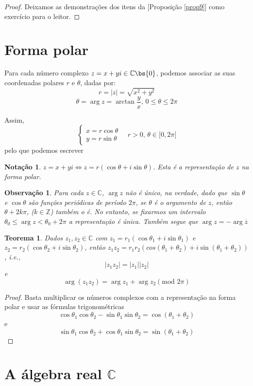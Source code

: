 \documentclass[12pt, oneside, a4paper, english, brazil]{abntex2}
\providecommand{\abs}[1]{\left\vert #1 \right\vert}
\newcommand{\C}{\mathbb{C}}
\providecommand{\propositionref}[1]{[Proposição \ref{#1}]}
\newcounter{geral}
\theoremstyle{normal}
\newtheorem{theorem}[geral]{Teorema}
\newtheorem{notation}[geral]{Notação}
\theoremstyle{observacao}
\newtheorem*{obs}{Observação}
\begin{document}
\begin{proof}
Deixamos as demonstrações dos itens da \propositionref{prop9} como exercício para o leitor.
\end{proof}

\section{Forma polar}
Para cada número complexo $z=x+yi \in \C \bs \{0\}$, podemos associar as suas coordenadas polares $r$ e $\theta$, dadas por:
\[
r = \abs{z} = \sqrt{x^2+y^2}
\]
\[
\theta = \arg z = \arctan \frac{y}{x} \text{, } 0 \leq \theta \leq 2\pi
\]

Assim, 
\[
\left\{\begin{array}{ll}
x= r \cos \theta\\
y= r \sin \theta
\end{array}
\right.
\quad r>0 \text{, } \theta \in [0, 2\pi[
\]
pelo que podemos escrever
\begin{notation}
$z=x+yi \Leftrightarrow z=r(\cos \theta + i \sin \theta)$. Esta é a representação de $z$ na forma polar.
\end{notation}

\begin{obs}
Para cada $z \in \C$, $\arg z$ não é único, na verdade, dado que $\sin \theta$ e $\cos \theta$ são funções periódicas de período $2\pi$, se $\theta$ é o argumento de $z$, então $\theta +2k\pi$, ($k \in \mathbb{Z}$) também o é. No entanto, se fixarmos um intervalo $\theta_0 \leq \arg z < \theta_0+2\pi$ a representação é única. Também segue que $\arg z = -\arg\overline{z}$
\end{obs}

\begin{theorem}
Dados $z_1,z_2 \in \C$ com $z_1 = r_1(\cos\theta_1+i\sin\theta_1)$ e $z_2 = r_2(\cos\theta_2+i\sin\theta_2)$, então $z_1z_2=r_1r_2(cos(\theta_1+\theta_2)+i\sin(\theta_1+\theta_2))$, i.e., 
\[
\abs{z_1z_2}=\abs{z_1}\abs{z_2}
\]
e
\[
\arg(z_1z_2) = \arg z_1 + \arg z_2 (\text{mod } 2\pi)
\] \label{teo12}
\end{theorem}
\begin{proof}
Basta multiplicar os números complexos com a representação na forma polar e usar as fórmulas trigonométricas
\[
\cos\theta_1\cos\theta_2-\sin\theta_1\sin\theta_2 = \cos(\theta_1+\theta_2)
\]
e
\[
\sin\theta_1\cos\theta_2+\cos\theta_1\sin\theta_2 = \sin(\theta_1+\theta_2)
\]
\end{proof}

\section{A álgebra real $\C$}
\end{document}
